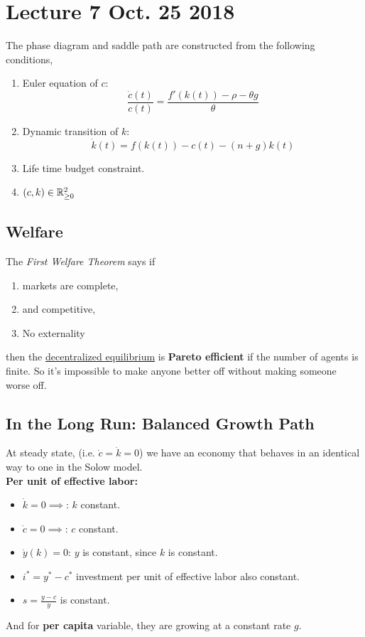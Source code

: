\documentclass[11pt]{article}
\begin{document}
	\section{Lecture 7 Oct. 25 2018}
		\begin{remark} The phase diagram and saddle path are constructed from the following conditions,
			\begin{enumerate}
				\item Euler equation of $c$: \[ \frac{\dot{c}(t)}{c(t)} = \frac{f'(k(t)) - \rho - \theta g}{\theta} \]
				\item Dynamic transition of $k$: \[ \dot{k}(t) = f(k(t)) - c(t) - (n+g)k(t) \]
				\item Life time budget constraint.
				\item $(c,k) \in \mathbb{R}_{\geq 0}^2$
			\end{enumerate}
		\end{remark}
		
		\subsection{Welfare}
			\par The \emph{First Welfare Theorem} says if 
			\begin{enumerate}
				\item markets are complete,
				\item and competitive,
				\item No externality
			\end{enumerate} then the \ul{decentralized equilibrium} is \textbf{Pareto efficient} if the number of agents is finite. So it's impossible to make anyone better off without making someone worse off.
		
		\subsection{In the Long Run: Balanced Growth Path}
			\par At steady state, (i.e. $\dot{c}=\dot{k}=0$) we have an economy that behaves in an identical way to one in the Solow model. \\
			\textbf{Per unit of effective labor: } 
			\begin{itemize}
				\item $\dot{k}=0\implies$: $k$ constant.
				\item $\dot{c}=0\implies$: $c$ constant.
				\item $\dot{y}(k)=0$: $y$ is constant, since $k$ is constant.
				\item $i^* = y^* - c^*$ investment per unit of effective labor also constant.
				\item $s = \frac{y-c}{y}$ is constant.
			\end{itemize}
			And for \textbf{per capita} variable, they are growing at a constant rate $g$.
			
\end{document}
